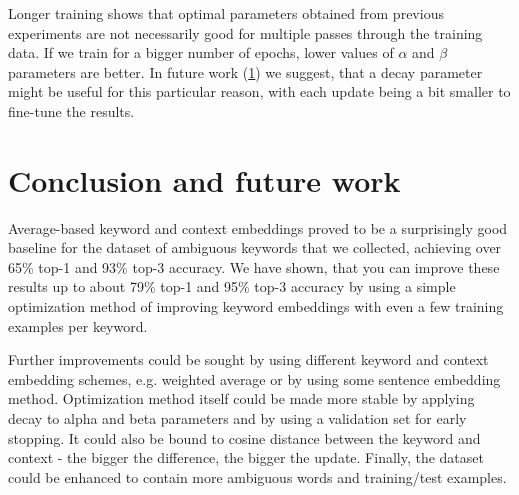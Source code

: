 \documentclass{llncs}
\begin{document}
Longer training shows that optimal parameters obtained from previous experiments are not necessarily good for multiple passes through the training data.
If we train for a bigger number of epochs, lower values of \(\alpha\) and \(\beta\) parameters are better.
In future work (\ref{sec:conclusion}) we suggest, that a decay parameter might be useful for this particular reason, with each update being a bit smaller to fine-tune the results.


\section{Conclusion and future work}
\label{sec:conclusion}

Average-based keyword and context embeddings proved to be a surprisingly good baseline for the dataset of ambiguous keywords that we collected, achieving over 65\% top-1 and 93\% top-3 accuracy.
We have shown, that you can improve these results up to about 79\% top-1 and 95\% top-3 accuracy by using a simple optimization method of improving keyword embeddings with even a few training examples per keyword.

Further improvements could be sought by using different keyword and context embedding schemes, e.g. weighted average or by using some sentence embedding method. Optimization method itself could be made more stable by applying decay to alpha and beta parameters and by using a validation set for early stopping. It could also be bound to cosine distance between the keyword and context - the bigger the difference, the bigger the update. Finally, the dataset could be enhanced to contain more ambiguous words and training/test examples.



\end{document}
